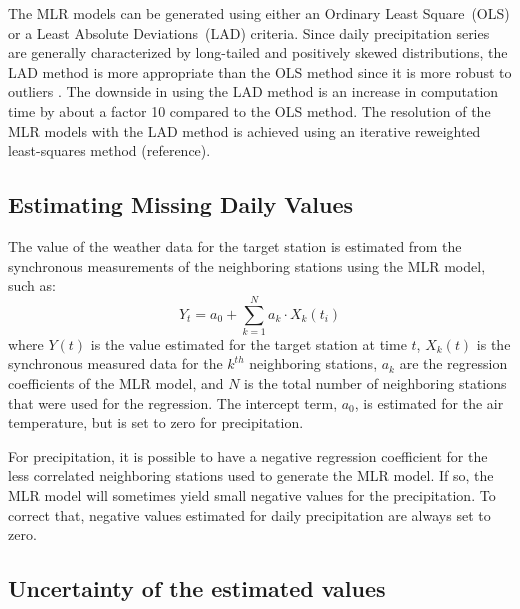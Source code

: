 \documentclass[TechnicalNoteMeteo.tex]{subfiles}
\begin{document}
The MLR models can be generated using either an Ordinary Least Square~(OLS) or a Least Absolute Deviations~(LAD) criteria. Since daily precipitation series are generally characterized by long-tailed and positively skewed distributions, the LAD method is more appropriate than the OLS method since it is more robust to outliers \citep{menke_geophysical_1989,eischeid_creating_2000}. The downside in using the LAD method is an increase in computation time by about a factor 10 compared to the OLS method. The resolution of the MLR models with the LAD method is achieved using an iterative reweighted least-squares method (reference).



\subsection{Estimating Missing Daily Values}\label{sec:est_miss_values}

The value of the weather data for the target station is estimated from the synchronous measurements of the neighboring stations using the MLR model, such as:
%
\begin{equation}
    Y_{t} = a_0 + \sum_{k=1}^{N} a_k \cdot X_k(t_i)
\end{equation}
%
where $Y(t)$ is the value estimated for the target station at time $t$, $X_k(t)$ is the synchronous measured data for the $k^{th}$ neighboring stations, $a_k$ are the regression coefficients of the MLR model, and $N$ is the total number of neighboring stations that were used for the regression. The intercept term, $a_0$, is estimated for the air temperature, but is set to zero for precipitation. 

For precipitation, it is possible to have a negative regression coefficient for the less correlated neighboring stations used to generate the MLR model. If so, the MLR model will sometimes yield small negative values for the precipitation. To correct that, negative values estimated for daily precipitation are always set to zero.

\subsection{Uncertainty of the estimated values}\label{subsec:crossval}
\end{document}
